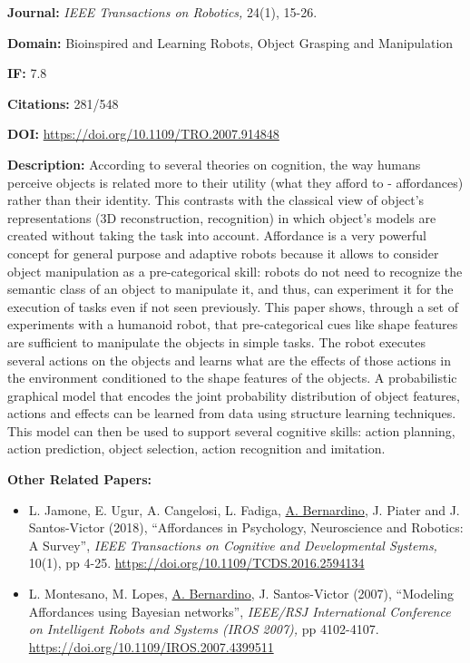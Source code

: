 \documentclass[
]{article}
\begin{document}
\textbf{Journal:} \emph{IEEE Transactions on Robotics,} 24(1), 15-26.

\textbf{Domain:} Bioinspired and Learning Robots, Object Grasping and
Manipulation

\textbf{IF:} 7.8

\textbf{Citations:} 281/548

\textbf{DOI:} \url{https://doi.org/10.1109/TRO.2007.914848}

\textbf{Description:} According to several theories on cognition, the
way humans perceive objects is related more to their utility (what they
afford to - affordances) rather than their identity. This contrasts with
the classical view of object's representations (3D reconstruction,
recognition) in which object's models are created without taking the
task into account. Affordance is a very powerful concept for general
purpose and adaptive robots because it allows to consider object
manipulation as a pre-categorical skill: robots do not need to recognize
the semantic class of an object to manipulate it, and thus, can
experiment it for the execution of tasks even if not seen previously.
This paper shows, through a set of experiments with a humanoid robot,
that pre-categorical cues like shape features are sufficient to
manipulate the objects in simple tasks. The robot executes several
actions on the objects and learns what are the effects of those actions
in the environment conditioned to the shape features of the objects. A
probabilistic graphical model that encodes the joint probability
distribution of object features, actions and effects can be learned from
data using structure learning techniques. This model can then be used to
support several cognitive skills: action planning, action prediction,
object selection, action recognition and imitation.

\textbf{Other Related Papers:}

\begin{itemize}
\item
  L. Jamone, E. Ugur, A. Cangelosi, L. Fadiga, \ul{A. Bernardino}, J.
  Piater and J. Santos-Victor (2018), ``Affordances in Psychology,
  Neuroscience and Robotics: A Survey'', \emph{IEEE Transactions on
  Cognitive and Developmental Systems,} 10(1), pp 4-25.
  \url{https://doi.org/10.1109/TCDS.2016.2594134}
\item
  L. Montesano, M. Lopes, \ul{A. Bernardino}, J. Santos-Victor (2007),
  ``Modeling Affordances using Bayesian networks'', \emph{IEEE/RSJ
  International Conference on Intelligent Robots and Systems (IROS
  2007),} pp 4102-4107. \url{https://doi.org/10.1109/IROS.2007.4399511}
\end{itemize}
\end{document}
